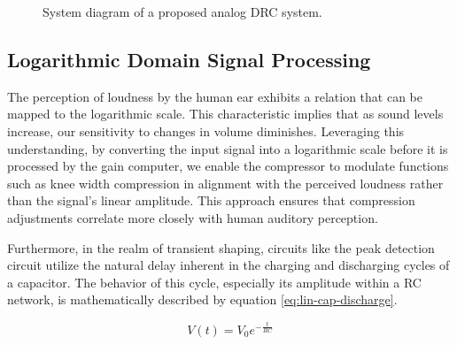 \documentclass[10pt]{article}
\begin{document}
\begin{multicols*}{2}
\begin{figure}[!th]

                        \caption{System diagram of a proposed analog DRC system.}
                        \label{fig:drc-diagram}

                    \end{figure}
    
            \subsection{Logarithmic Domain Signal Processing}
                The perception of loudness by the human ear exhibits a relation that can be mapped to the logarithmic scale. This characteristic implies that as sound levels increase, our sensitivity to changes in volume diminishes. Leveraging this understanding, by converting the input signal into a logarithmic scale before it is processed by the gain computer, we enable the compressor to modulate functions such as knee width compression in alignment with the perceived loudness rather than the signal's linear amplitude. This approach ensures that compression adjustments correlate more closely with human auditory perception.\par
                Furthermore, in the realm of transient shaping, circuits like the peak detection circuit utilize the natural delay inherent in the charging and discharging cycles of a capacitor. The behavior of this cycle, especially its amplitude within a RC network, is mathematically described by equation \ref{eq:lin-cap-discharge}.
                
                    \begin{equation}\label{eq:lin-cap-discharge}
                        V(t) = V_0 e^{-\frac{t}{RC}}
                    \end{equation}    
                

\end{multicols*}
\end{document}
